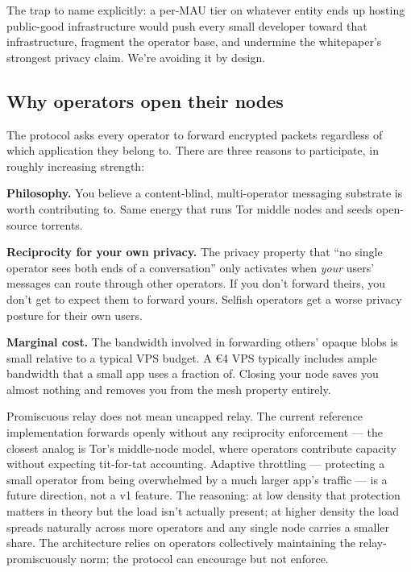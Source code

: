 \documentclass[11pt, a4paper]{article}
\begin{document}
The trap to name explicitly: a per-MAU tier on whatever entity ends up hosting public-good infrastructure would push every small developer toward that infrastructure, fragment the operator base, and undermine the whitepaper's strongest privacy claim. We're avoiding it by design.

\subsection*{Why operators open their nodes}

The protocol asks every operator to forward encrypted packets regardless of which application they belong to. There are three reasons to participate, in roughly increasing strength:

\textbf{Philosophy.} You believe a content-blind, multi-operator messaging substrate is worth contributing to. Same energy that runs Tor middle nodes and seeds open-source torrents.

\textbf{Reciprocity for your own privacy.} The privacy property that ``no single operator sees both ends of a conversation'' only activates when \emph{your} users' messages can route through other operators. If you don't forward theirs, you don't get to expect them to forward yours. Selfish operators get a worse privacy posture for their own users.

\textbf{Marginal cost.} The bandwidth involved in forwarding others' opaque blobs is small relative to a typical VPS budget. A €4 VPS typically includes ample bandwidth that a small app uses a fraction of. Closing your node saves you almost nothing and removes you from the mesh property entirely.

Promiscuous relay does not mean uncapped relay. The current reference implementation forwards openly without any reciprocity enforcement --- the closest analog is Tor's middle-node model, where operators contribute capacity without expecting tit-for-tat accounting. Adaptive throttling --- protecting a small operator from being overwhelmed by a much larger app's traffic --- is a future direction, not a v1 feature. The reasoning: at low density that protection matters in theory but the load isn't actually present; at higher density the load spreads naturally across more operators and any single node carries a smaller share. The architecture relies on operators collectively maintaining the relay-promiscuously norm; the protocol can encourage but not enforce.

\end{document}
